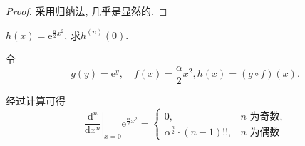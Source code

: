 
\begin{proof}
    采用归纳法, 几乎是显然的.
\end{proof}

\begin{example}
    $h\left( x \right) = \mathrm{e}^{\frac{\alpha}{2} x^{2}}$, 求$h^{(n)} (0)$.
    
    令
    \begin{equation}
      g(y) = \mathrm{e}^{y}, \quad f(x) = \frac{\alpha}{2} x^{2}, h\left( x \right) = \left( g\circ f \right) (x).
    \end{equation}

    经过计算可得
    \begin{equation}
      \left. \frac{\mathrm{d}^n}{\mathrm{d} x^n} \right|_{x = 0} \mathrm{e}^{ \frac{\alpha}{2} x^{2}} = \begin{cases} 
        0, & n\text{ 为奇数,} 
        \\ 
        \alpha ^{\frac{n}{2}} \cdot \left( n -1 \right) !!, & n \text{ 为偶数} 
      \end{cases}
    \end{equation}
\end{example}